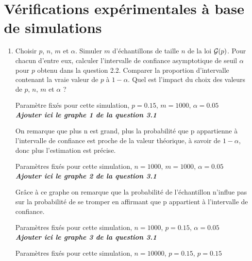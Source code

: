 \documentclass[12pt]{article}
\begin{document}
\section{Vérifications expérimentales à base de simulations}


\begin{enumerate}

\renewcommand{\labelenumi}{\arabic{section}.\arabic{enumi}.}

\item Choisir $p$, $n$, $m$ et $\alpha$. Simuler $m$ d'échantillons de taille $n$ de la loi ${\cal G}(p)$. Pour chacun d'entre eux, calculer l'intervalle de confiance asymptotique de seuil $\alpha$ pour $p$ obtenu dans la question 2.2. Comparer la proportion d'intervalle contenant la vraie valeur de $p$ à $1-\alpha$. Quel est l'impact du choix des valeurs de $p$, $n$, $m$ et $\alpha$ ?

\vspace{3mm}

Paramètre fixés pour cette simulation, $p=0.15$, $m=1000$, $\alpha = 0.05$\\

\textbf{\textit{Ajouter ici le graphe 1 de la question 3.1}}

On remarque que plus n est grand, plus la probabilité que  p appartienne à l'intervalle de confiance est proche de la valeur théorique, à savoir de $1-\alpha$, donc plus l'estimation est précise.

\vspace{5mm}
Paramètres fixés pour cette simulation, $n=1000$, $m=1000$, $\alpha =0.05$ \\
\textbf{\textit{Ajouter ici le graphe 2 de la question 3.1}}

Grâce à ce graphe on remarque que la probabilité de l'échantillon n'influe pas sur la probabilité de se tromper en affirmant que p appartient à l'intervalle de confiance. 

\vspace{5mm}


Paramètres fixés pour cette simulation, $n=1000$, $p=0.15$, $\alpha = 0.05$ \\
\textbf{\textit{Ajouter ici le graphe 3 de la question 3.1}}

\vspace{5mm}


Paramètres fixés pour cette simulation, $n=10000$, $p=0.15$, $p=0.15$ \\


\end{enumerate}
\end{document}

